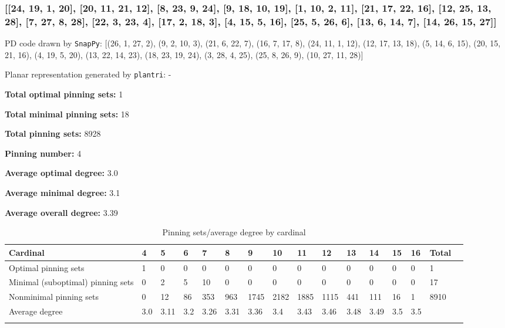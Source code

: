 \documentclass{article}%
\begin{document}
\newpage

\subsubsection{[[24, 19, 1, 20], [20, 11, 21, 12], [8, 23, 9, 24], [9, 18, 10, 19], [1, 10, 2, 11], [21, 17, 22, 16], [12, 25, 13, 28], [7, 27, 8, 28], [22, 3, 23, 4], [17, 2, 18, 3], [4, 15, 5, 16], [25, 5, 26, 6], [13, 6, 14, 7], [14, 26, 15, 27]]}

{\small\noindent PD code drawn by \texttt{SnapPy}: [(26, 1, 27, 2), (9, 2, 10, 3), (21, 6, 22, 7), (16, 7, 17, 8), (24, 11, 1, 12), (12, 17, 13, 18), (5, 14, 6, 15), (20, 15, 21, 16), (4, 19, 5, 20), (13, 22, 14, 23), (18, 23, 19, 24), (3, 28, 4, 25), (25, 8, 26, 9), (10, 27, 11, 28)]}

{\small\noindent Planar representation generated by \texttt{plantri}: -}

\begin{multicols}{2}
{\normalsize \noindent\textbf{Total optimal pinning sets:} 1

\noindent\textbf{Total minimal pinning sets:} 18

\noindent\textbf{Total pinning sets:} 8928

\noindent\textbf{Pinning number:} 4

}
\columnbreak

{\normalsize \noindent\textbf{Average optimal degree:} 3.0

\noindent\textbf{Average minimal degree:} 3.1

\noindent\textbf{Average overall degree:} 3.39

}
\end{multicols}

\begin{table}[ht]
	\caption{Pinning sets/average degree by cardinal}
	\centering
	\renewcommand{\arraystretch}{1.5}
	\begin{tabularx}{\textwidth}{lXXXXXXXXXXXXXXX}
		\toprule
			Cardinal & 4 & 5 & 6 & 7 & 8 & 9 & 10 & 11 & 12 & 13 & 14 & 15 & 16 & Total\\
			\hline
			Optimal pinning sets & 1 & 0 & 0 & 0 & 0 & 0 & 0 & 0 & 0 & 0 & 0 & 0 & 0 & 1 \\
			Minimal (suboptimal) pinning sets & 0 & 2 & 5 & 10 & 0 & 0 & 0 & 0 & 0 & 0 & 0 & 0 & 0 & 17 \\
			Nonminimal pinning sets & 0 & 12 & 86 & 353 & 963 & 1745 & 2182 & 1885 & 1115 & 441 & 111 & 16 & 1 & 8910 \\
			Average degree & 3.0 & 3.11 & 3.2 & 3.26 & 3.31 & 3.36 & 3.4 & 3.43 & 3.46 & 3.48 & 3.49 & 3.5 & 3.5 &  \\
		\bottomrule \\ 
	\end{tabularx}
\end{table}
\end{document}
